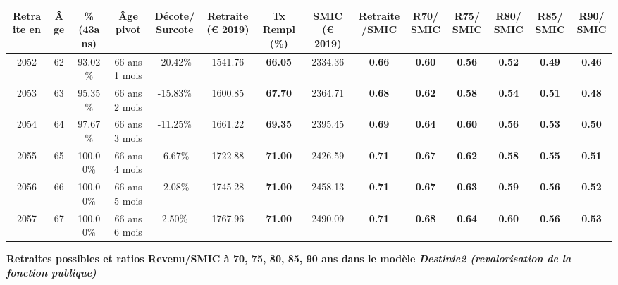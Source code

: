 \begin{adjustbox}{max width=\textwidth} 
\begin{tabular}[htb]{|c|c||c|c|c||c|c||c|c||c|c|c|c|c|} 
\hline 
 Retraite en &  Âge &  \%(43ans) &  Âge pivot &  Décote/Surcote &  Retraite (\euro{} 2019) &  Tx Rempl(\%) &  SMIC (\euro{} 2019) &  Retraite/SMIC &  R70/SMIC &  R75/SMIC &  R80/SMIC &  R85/SMIC &  R90/SMIC \\ 
\hline \hline 
 2052 &  62 &  93.02\% &  66 ans 1 mois &  -20.42\% &  1541.76 &  {\bf 66.05} &  2334.36 &  {\bf {\color{red} 0.66}} &  {\bf {\color{red} 0.60}} &  {\bf {\color{red} 0.56}} &  {\bf {\color{red} 0.52}} &  {\bf {\color{red} 0.49}} &  {\bf {\color{red} 0.46}} \\ 
\hline 
 2053 &  63 &  95.35\% &  66 ans 2 mois &  -15.83\% &  1600.85 &  {\bf 67.70} &  2364.71 &  {\bf {\color{red} 0.68}} &  {\bf {\color{red} 0.62}} &  {\bf {\color{red} 0.58}} &  {\bf {\color{red} 0.54}} &  {\bf {\color{red} 0.51}} &  {\bf {\color{red} 0.48}} \\ 
\hline 
 2054 &  64 &  97.67\% &  66 ans 3 mois &  -11.25\% &  1661.22 &  {\bf 69.35} &  2395.45 &  {\bf {\color{red} 0.69}} &  {\bf {\color{red} 0.64}} &  {\bf {\color{red} 0.60}} &  {\bf {\color{red} 0.56}} &  {\bf {\color{red} 0.53}} &  {\bf {\color{red} 0.50}} \\ 
\hline 
 2055 &  65 &  100.00\% &  66 ans 4 mois &  -6.67\% &  1722.88 &  {\bf 71.00} &  2426.59 &  {\bf {\color{red} 0.71}} &  {\bf {\color{red} 0.67}} &  {\bf {\color{red} 0.62}} &  {\bf {\color{red} 0.58}} &  {\bf {\color{red} 0.55}} &  {\bf {\color{red} 0.51}} \\ 
\hline 
 2056 &  66 &  100.00\% &  66 ans 5 mois &  -2.08\% &  1745.28 &  {\bf 71.00} &  2458.13 &  {\bf {\color{red} 0.71}} &  {\bf {\color{red} 0.67}} &  {\bf {\color{red} 0.63}} &  {\bf {\color{red} 0.59}} &  {\bf {\color{red} 0.56}} &  {\bf {\color{red} 0.52}} \\ 
\hline 
 2057 &  67 &  100.00\% &  66 ans 6 mois &  2.50\% &  1767.96 &  {\bf 71.00} &  2490.09 &  {\bf {\color{red} 0.71}} &  {\bf {\color{red} 0.68}} &  {\bf {\color{red} 0.64}} &  {\bf {\color{red} 0.60}} &  {\bf {\color{red} 0.56}} &  {\bf {\color{red} 0.53}} \\ 
\hline 
\hline 
\end{tabular} 
\end{adjustbox} 
 
 \vspace{0.1cm} 
{\bf \noindent Retraites possibles et ratios Revenu/SMIC à 70, 75, 80, 85, 90 ans dans le modèle \emph{Destinie2 (revalorisation de la fonction publique)}}  
 
